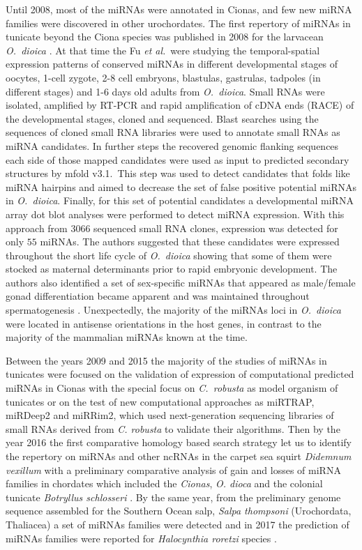 \documentclass[graybox]{svmult}
\begin{document}
Until 2008, most of the miRNAs were annotated in Cionas, and few new miRNA 
families were discovered in other urochordates. 
The first repertory of miRNAs in tunicate beyond the Ciona
species was published in 2008 for the larvacean \textit{O.\ dioica}
\cite{Fu:08}. At that time the Fu \emph{et al.}\ were studying the
temporal-spatial expression patterns of conserved miRNAs in different
developmental stages of oocytes, 1-cell zygote, 2-8 cell embryons,
blastulas, gastrulas, tadpoles (in different stages) and 1-6 days old adults 
from \textit{O.\ dioica}. Small RNAs were isolated, amplified by
RT-PCR and rapid amplification of cDNA ends (RACE) of the developmental
stages, cloned and sequenced. Blast searches using the sequences of cloned
small RNA libraries were used to annotate small RNAs as miRNA
candidates. In further steps the recovered genomic flanking sequences each
side of those mapped candidates were used as input to predicted secondary
structures by mfold v3.1.\ This step was used to detect candidates that
folds like miRNA hairpins and aimed to decrease the set of false positive
potential miRNAs in \textit{O.\ dioica}. Finally, for this set of potential
candidates a developmental miRNA array dot blot analyses were performed to
detect miRNA expression. With this approach from $3066$ sequenced small RNA
clones, expression was detected for only $55$ miRNAs.  The authors
suggested that these candidates were expressed throughout the short life
cycle of \textit{O.\ dioica} showing that some of them were stocked as
maternal determinants prior to rapid embryonic development. The authors
also identified a set of sex-specific miRNAs that appeared as male/female
gonad differentiation became apparent and was maintained throughout
spermatogenesis \cite{Fu:08}. Unexpectedly, the majority of the miRNAs
loci in \textit{O.\ dioica} were located in antisense orientations in the
host genes, in contrast to the majority of the mammalian miRNAs known at
the time.

Between the years 2009 and 2015 the majority of the studies of miRNAs in
tunicates were focused on the validation of expression of computational
predicted miRNAs in Cionas with the special focus on \textit{C.\ robusta} as
model organism of tunicates or on the test of new computational
approaches as miRTRAP, miRDeep2 and miRRim2, which used next-generation
sequencing libraries of small RNAs derived from \textit{C. robusta} to
validate their algorithms.  Then by the year 2016 the first comparative
homology based search strategy let us to identify the repertory on miRNAs
and other ncRNAs in the carpet sea squirt \textit{Didemnum vexillum} with a
preliminary comparative analysis of gain and losses of miRNA families in
chordates which included the \textit{Cionas}, \textit{O. dioca} and the
colonial tunicate \textit{Botryllus schlosseri}
\cite{Velandia-Huerto2016}. By the same year, from the preliminary genome
sequence assembled for the Southern Ocean salp, \textit{Salpa thompsoni}
(Urochordata, Thaliacea) a set of miRNAs families were detected
\cite{Jue2016} and in 2017 the prediction of miRNAs families were reported
for \textit{Halocynthia roretzi} species \cite{Wang2017}.
\end{document}
